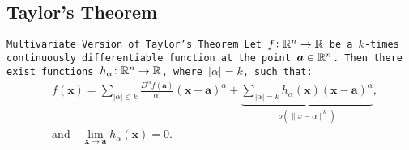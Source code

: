 \documentclass[11pt,a4paper]{article}
\begin{document}
\subsection{Taylor's Theorem}
\tt{Multivariate Version of Taylor's Theorem}
Let $f \colon \mathbb{R}^n \to \mathbb{R}$ be a $k$-times continuously differentiable 
function at the point $\boldsymbol{a} \in \mathbb{R}^n$. Then there exist functions 
$h_\alpha \colon \mathbb{R}^n \to \mathbb{R}$, where $|\alpha| = k$, such that:
\[
  {\begin{aligned}&f({\boldsymbol {x}})=\sum _{|\alpha |\leq k}{\frac 
  {D^{\alpha }f({\boldsymbol {a}})}{\alpha !}}({\boldsymbol {x}}-
  {\boldsymbol 
  {a}})^{\alpha }+\underbrace{\sum _{|\alpha |=k}h_{\alpha }({\boldsymbol 
  {x}})({\boldsymbol {x}}-{\boldsymbol {a}})^{\alpha }}_{o(\|x-\alpha\|
  ^k)},\\&{\mbox{and}}\quad \lim _{{\boldsymbol {x}}\to {\boldsymbol {a}}}
  h_{\alpha }({\boldsymbol {x}})=0.\end{aligned}}
\]

\newpage
\end{document}
